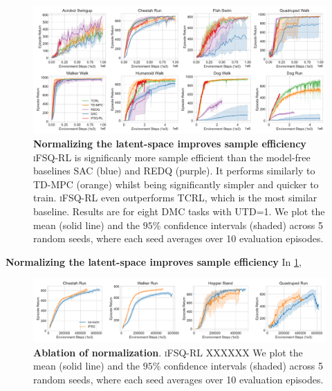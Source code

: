 \documentclass{article}
\theoremstyle{plain}
\theoremstyle{definition}
\theoremstyle{remark}
\newcommand{\our}{\textsc{iFSQ-RL}\xspace}
\begin{document}




\begin{figure}[ht]
\vskip 0.2in
\begin{center}
\centerline{\includegraphics[width=1.0\textwidth]{./figs/main_plot.pdf}}
\caption{\textbf{Normalizing the latent-space improves sample efficiency} \our is significanly more sample efficient than the model-free baselines SAC (blue) and REDQ (purple). It performs similarly to TD-MPC (orange) whilst being significantly simpler and quicker to train. \our even outperforms TCRL, which is the most similar baseline. Results are for eight DMC tasks with UTD=1. We plot the mean (solid line) and the $95\%$ confidence intervals (shaded) across 5 random seeds, where each seed averages over 10 evaluation episodes.}
\label{fig:normalization_improves_sample_efficiency}
\end{center}
\vskip -0.2in
\end{figure}

\textbf{Normalizing the latent-space improves sample efficiency}
In \cref{fig:normalization_improves_sample_efficiency},



\begin{figure}[ht]
\vskip 0.2in
\begin{center}
\centerline{\includegraphics[width=1.0\textwidth]{./figs/normalization-ablation.pdf}}
\caption{\textbf{Ablation of normalization}. \our XXXXXX We plot the mean (solid line) and the $95\%$ confidence intervals (shaded) across 5 random seeds, where each seed averages over 10 evaluation episodes.}
\label{fig:multi-task-pretraining}
\end{center}
\vskip -0.2in
\end{figure}
\end{document}
